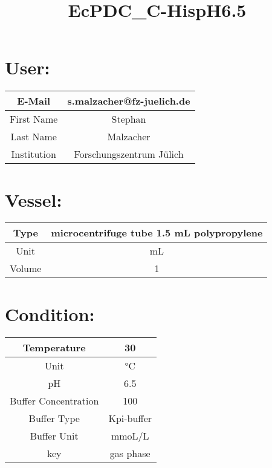 \documentclass{article}%
\title{EcPDC\_C{-}HispH6.5}%
\begin{document}
%
\normalsize%
\maketitle%
\section{User:}%
\label{sec:User}%
\begin{tabular}{|c|c|}%
\hline%
E{-}Mail&s.malzacher@fz{-}juelich.de\\%
\hline%
First Name&Stephan\\%
\hline%
Last Name&Malzacher\\%
\hline%
Institution&Forschungszentrum Jülich\\%
\hline%
\end{tabular}

%
\section{Vessel:}%
\label{sec:Vessel}%
\begin{tabular}{|c|c|}%
\hline%
Type&microcentrifuge tube 1.5 mL polypropylene\\%
\hline%
Unit&mL\\%
\hline%
Volume&1\\%
\hline%
\end{tabular}

%
\section{Condition:}%
\label{sec:Condition}%
\begin{tabular}{|c|c|}%
\hline%
Temperature&30\\%
\hline%
Unit&°C\\%
\hline%
pH&6.5\\%
\hline%
Buffer Concentration&100\\%
\hline%
Buffer Type&Kpi{-}buffer\\%
\hline%
Buffer Unit&mmoL/L\\%
\hline%
key&gas phase\\%
\hline%
\end{tabular}

%
\end{document}
